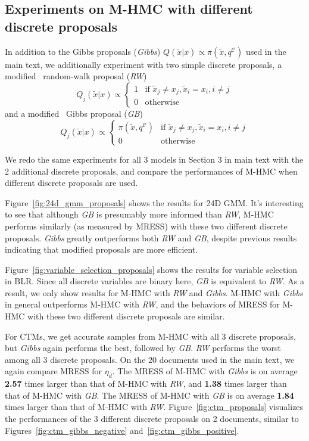 \documentclass{article}
\newcommand{\calc}{\mathcal{C}}
\begin{document}
\subsection{Experiments on M-HMC with different discrete proposals}

In addition to the Gibbs proposals (\textit{Gibbs}) $Q(\tilde{x} | x) \propto \pi(\tilde{x}, q^{\calc})$ used in the main text, we additionally experiment with two simple discrete proposals, a modified~\cite{Liu1996-dg} random-walk proposal (\textit{RW})
\[
Q_j(\tilde{x}|x) \propto \begin{cases}1 & \text{if } \tilde{x}_j \neq x_j, \tilde{x}_i = x_i, i \neq j_{}\\ 0 & \text{otherwise}\end{cases}
\] 
and a modified~\cite{Liu1996-dg} Gibbs proposal (\textit{GB})
\[
	Q_j (\tilde{x} |x) \propto \begin{cases}\pi(\tilde{x}, q^{\calc}) & \text{if } \tilde{x}_j \neq x_j, \tilde{x}_i = x_i, i \neq j_{}\\ 0 & \text{otherwise}\end{cases}
\]

We redo the same experiments for all 3 models in Section 3 in main text with the 2 additional discrete proposals, and compare the performances of M-HMC when different discrete proposals are used.

Figure~\ref{fig:24d_gmm_proposals} shows the results for 24D GMM. It's interesting to see that although \textit{GB} is presumably more informed than \textit{RW}, M-HMC performs similarly (as measured by MRESS) with these two different discrete proposals. \textit{Gibbs} greatly outperforms both \textit{RW} and \textit{GB}, despite previous results~\cite{Liu1996-dg} indicating that modified proposals are more efficient.

Figure~\ref{fig:variable_selection_proposals} shows the results for variable selection in BLR. Since all discrete variables are binary here, \textit{GB} is equivalent to \textit{RW}. As a result, we only show results for M-HMC with \textit{RW} and \textit{Gibbs}. M-HMC with \textit{Gibbs} in general outperforms M-HMC with \textit{RW}, and the behaviors of MRESS for M-HMC with these two different discrete proposals are similar.

For CTMs, we get accurate samples from M-HMC with all 3 discrete proposals, but \textit{Gibbs} again performs the best, followed by \textit{GB}. \textit{RW} performs the worst among all 3 discrete proposals. On the 20 documents used in the main text, we again compare MRESS for $\eta_d$.  The MRESS of M-HMC with \textit{Gibbs} is on average \textbf{2.57} times larger than that of M-HMC with \textit{RW}, and \textbf{1.38} times larger than that of M-HMC with \textit{GB}. The MRESS of M-HMC with \textit{GB} is on average \textbf{1.84} times larger than that of M-HMC with \textit{RW}. Figure~\ref{fig:ctm_proposals} visualizes the performances of the 3 different discrete proposals on 2 documents, similar to Figures~\ref{fig:ctm_gibbs_negative} and~\ref{fig:ctm_gibbs_positive}.



\end{document}
